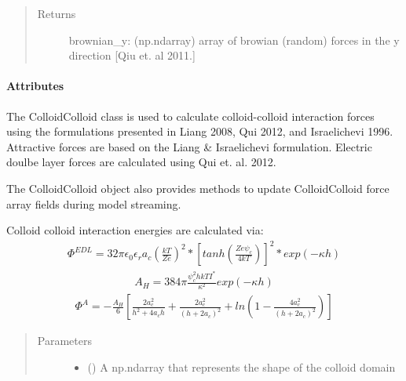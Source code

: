 \documentclass[letterpaper,10pt,english]{sphinxmanual}
\begin{document}
\begin{fulllineitems}
\begin{quote}
\begin{description}
\item[{Returns}] \leavevmode
brownian\_y: (np.ndarray) array of browian (random)
forces in the y direction {[}Qiu et. al 2011.{]}

\end{description}\end{quote}
\paragraph{Attributes}

\end{fulllineitems}


\begin{fulllineitems}
\label{\detokenize{index:lb_colloids.Colloids.Colloid_Math.ColloidColloid}}
The ColloidColloid class is used to calculate colloid-colloid interaction forces
using the formulations presented in Liang 2008, Qui 2012, and Israelichevi 1996.
Attractive forces are based on the Liang \& Israelichevi formulation. Electric
doulbe layer forces are calculated using Qui et. al. 2012.

The ColloidColloid object also provides methods to update ColloidColloid force
array fields during model streaming.

Colloid colloid interaction energies are calculated via:
\begin{equation*}
\begin{split}\Phi^{EDL} = 32 \pi \epsilon_{0} \epsilon_{r} a_{c}
(\frac{kT}{Ze})^{2} * [tanh(\frac{Ze\psi_c}{4kT})]^{2}
* exp(-\kappa h)\end{split}
\end{equation*}\begin{equation*}
\begin{split}A_{H} = 384 \pi \frac{\psi_{c}^{2} h k T I^{*}}{\kappa^{2}} exp(- \kappa h)\end{split}
\end{equation*}\begin{equation*}
\begin{split}\Phi^{A} = - \frac{A_{H}}{6}[\frac{2a_{c}^{2}}{h^{2} + 4a_{c}h} +
\frac{2a_{c}^{2}}{(h + 2a_{c})^{2}} + ln(1 - \frac{4a_{c}^{2}}{(h + 2a_{c})^{2}})]\end{split}
\end{equation*}\begin{quote}\begin{description}
\item[{Parameters}] \leavevmode\begin{itemize}
\item {} 
 () \textendash{} A np.ndarray that represents the shape of the colloid
domain


\end{itemize}
\end{description}
\end{quote}
\end{fulllineitems}
\end{document}
